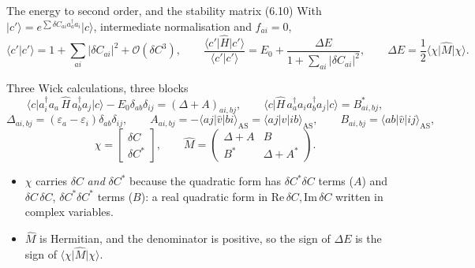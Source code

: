 \documentclass[aspectratio=169,10pt]{beamer}
\newcommand{\ket}[1]{\vert #1\rangle}
\newcommand{\bra}[1]{\langle #1\vert}
\newcommand{\braket}[2]{\langle #1\vert #2\rangle}
\newcommand{\element}[3]{\langle #1\vert #2\vert #3\rangle}
\newcommand{\bigO}{\mathcal{O}}
\begin{document}
\begin{frame}{The energy to second order, and the stability matrix (6.10)}
  \footnotesize
  With $\ket{c'}=e^{\sum\delta C_{ai}a_a^{\dagger}a_i}\ket{c}$, intermediate normalisation and $f_{ai}=0$,
  \[
    \braket{c'}{c'}=1+\sum_{ai}|\delta C_{ai}|^2+\bigO(\delta C^3),
    \qquad
    \frac{\element{c'}{\hat H}{c'}}{\braket{c'}{c'}}=E_0+\frac{\Delta E}{1+\sum_{ai}|\delta C_{ai}|^2},
    \qquad
    \Delta E=\frac12\bra{\chi}\hat M\ket{\chi}.
  \]
  \begin{block}{Three Wick calculations, three blocks}
    \[
      \element{c}{a_i^{\dagger}a_a\,\hat H\,a_b^{\dagger}a_j}{c}-E_0\delta_{ab}\delta_{ij}=(\Delta+A)_{ai,bj},\qquad
      \element{c}{\hat H\,a_a^{\dagger}a_ia_b^{\dagger}a_j}{c}=B^{*}_{ai,bj},
    \]
    \[
      \Delta_{ai,bj}=(\varepsilon_a-\varepsilon_i)\delta_{ab}\delta_{ij},\qquad
      A_{ai,bj}=-\element{aj}{\hat v}{bi}_{\mathrm{AS}}=\element{aj}{\hat v}{ib}_{\mathrm{AS}},\qquad
      B_{ai,bj}=\element{ab}{\hat v}{ij}_{\mathrm{AS}},
    \]
    \[
      \chi=\begin{bmatrix}\delta C\\ \delta C^{*}\end{bmatrix},\qquad
      \hat M=\begin{pmatrix}\Delta+A & B\\ B^{*} & \Delta+A^{*}\end{pmatrix}.
    \]
  \end{block}
  \begin{itemize}
    \item $\chi$ carries $\delta C$ \emph{and} $\delta C^{*}$ because the quadratic form has $\delta C^{*}\delta C$ terms ($A$) and $\delta C\,\delta C$, $\delta C^{*}\delta C^{*}$ terms ($B$): a real quadratic form in $\mathrm{Re}\,\delta C,\mathrm{Im}\,\delta C$ written in complex variables.
    \item $\hat M$ is Hermitian, and the denominator is positive, so the sign of $\Delta E$ is the sign of $\bra{\chi}\hat M\ket{\chi}$.
  \end{itemize}
\end{frame}
\end{document}
